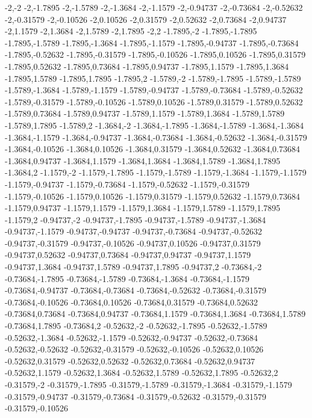 -2,-2
-2,-1.7895
-2,-1.5789
-2,-1.3684
-2,-1.1579
-2,-0.94737
-2,-0.73684
-2,-0.52632
-2,-0.31579
-2,-0.10526
-2,0.10526
-2,0.31579
-2,0.52632
-2,0.73684
-2,0.94737
-2,1.1579
-2,1.3684
-2,1.5789
-2,1.7895
-2,2
-1.7895,-2
-1.7895,-1.7895
-1.7895,-1.5789
-1.7895,-1.3684
-1.7895,-1.1579
-1.7895,-0.94737
-1.7895,-0.73684
-1.7895,-0.52632
-1.7895,-0.31579
-1.7895,-0.10526
-1.7895,0.10526
-1.7895,0.31579
-1.7895,0.52632
-1.7895,0.73684
-1.7895,0.94737
-1.7895,1.1579
-1.7895,1.3684
-1.7895,1.5789
-1.7895,1.7895
-1.7895,2
-1.5789,-2
-1.5789,-1.7895
-1.5789,-1.5789
-1.5789,-1.3684
-1.5789,-1.1579
-1.5789,-0.94737
-1.5789,-0.73684
-1.5789,-0.52632
-1.5789,-0.31579
-1.5789,-0.10526
-1.5789,0.10526
-1.5789,0.31579
-1.5789,0.52632
-1.5789,0.73684
-1.5789,0.94737
-1.5789,1.1579
-1.5789,1.3684
-1.5789,1.5789
-1.5789,1.7895
-1.5789,2
-1.3684,-2
-1.3684,-1.7895
-1.3684,-1.5789
-1.3684,-1.3684
-1.3684,-1.1579
-1.3684,-0.94737
-1.3684,-0.73684
-1.3684,-0.52632
-1.3684,-0.31579
-1.3684,-0.10526
-1.3684,0.10526
-1.3684,0.31579
-1.3684,0.52632
-1.3684,0.73684
-1.3684,0.94737
-1.3684,1.1579
-1.3684,1.3684
-1.3684,1.5789
-1.3684,1.7895
-1.3684,2
-1.1579,-2
-1.1579,-1.7895
-1.1579,-1.5789
-1.1579,-1.3684
-1.1579,-1.1579
-1.1579,-0.94737
-1.1579,-0.73684
-1.1579,-0.52632
-1.1579,-0.31579
-1.1579,-0.10526
-1.1579,0.10526
-1.1579,0.31579
-1.1579,0.52632
-1.1579,0.73684
-1.1579,0.94737
-1.1579,1.1579
-1.1579,1.3684
-1.1579,1.5789
-1.1579,1.7895
-1.1579,2
-0.94737,-2
-0.94737,-1.7895
-0.94737,-1.5789
-0.94737,-1.3684
-0.94737,-1.1579
-0.94737,-0.94737
-0.94737,-0.73684
-0.94737,-0.52632
-0.94737,-0.31579
-0.94737,-0.10526
-0.94737,0.10526
-0.94737,0.31579
-0.94737,0.52632
-0.94737,0.73684
-0.94737,0.94737
-0.94737,1.1579
-0.94737,1.3684
-0.94737,1.5789
-0.94737,1.7895
-0.94737,2
-0.73684,-2
-0.73684,-1.7895
-0.73684,-1.5789
-0.73684,-1.3684
-0.73684,-1.1579
-0.73684,-0.94737
-0.73684,-0.73684
-0.73684,-0.52632
-0.73684,-0.31579
-0.73684,-0.10526
-0.73684,0.10526
-0.73684,0.31579
-0.73684,0.52632
-0.73684,0.73684
-0.73684,0.94737
-0.73684,1.1579
-0.73684,1.3684
-0.73684,1.5789
-0.73684,1.7895
-0.73684,2
-0.52632,-2
-0.52632,-1.7895
-0.52632,-1.5789
-0.52632,-1.3684
-0.52632,-1.1579
-0.52632,-0.94737
-0.52632,-0.73684
-0.52632,-0.52632
-0.52632,-0.31579
-0.52632,-0.10526
-0.52632,0.10526
-0.52632,0.31579
-0.52632,0.52632
-0.52632,0.73684
-0.52632,0.94737
-0.52632,1.1579
-0.52632,1.3684
-0.52632,1.5789
-0.52632,1.7895
-0.52632,2
-0.31579,-2
-0.31579,-1.7895
-0.31579,-1.5789
-0.31579,-1.3684
-0.31579,-1.1579
-0.31579,-0.94737
-0.31579,-0.73684
-0.31579,-0.52632
-0.31579,-0.31579
-0.31579,-0.10526
